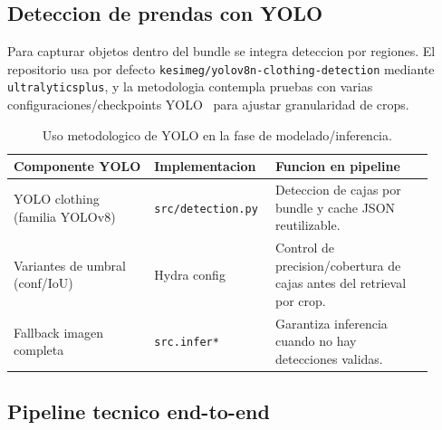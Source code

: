 \subsection{Deteccion de prendas con YOLO}

Para capturar objetos dentro del bundle se integra deteccion por regiones. El repositorio usa por defecto \texttt{kesimeg/yolov8n-clothing-detection} mediante \texttt{ultralyticsplus}, y la metodologia contempla pruebas con varias configuraciones/checkpoints YOLO~\cite{jocher2023yolo} para ajustar granularidad de crops.

\begin{table}[h]
  \centering
  \small
  \begin{tabular}{p{0.32\linewidth} p{0.24\linewidth} p{0.36\linewidth}}
    \toprule
    \textbf{Componente YOLO} & \textbf{Implementacion} & \textbf{Funcion en pipeline} \\
    \midrule
    YOLO clothing (familia YOLOv8) & \texttt{src/detection.py} & Deteccion de cajas por bundle y cache JSON reutilizable. \\
    Variantes de umbral (conf/IoU) & Hydra config & Control de precision/cobertura de cajas antes del retrieval por crop. \\
    Fallback imagen completa & \texttt{src.infer*} & Garantiza inferencia cuando no hay detecciones validas. \\
    \bottomrule
  \end{tabular}
  \caption{Uso metodologico de YOLO en la fase de modelado/inferencia.}
  \label{tab:yolo-components}
\end{table}

\subsection{Pipeline tecnico end-to-end}

